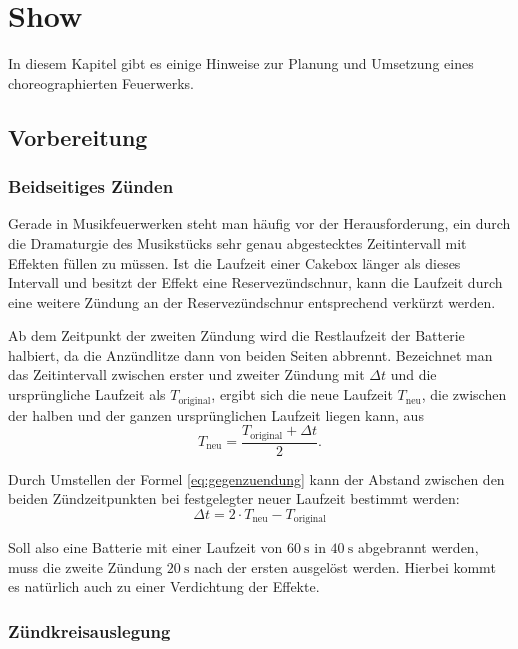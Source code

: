 \documentclass[paper=a4, parskip, numbers=noenddot, toc=listof, headsepline]{scrbook}
\begin{document}
	\chapter{Show}
		In diesem Kapitel gibt es einige Hinweise zur Planung und Umsetzung eines choreographierten Feuerwerks.
		\section{Vorbereitung}

			\subsection{Beidseitiges Zünden}
				Gerade in Musikfeuerwerken steht man häufig vor der Herausforderung, ein durch die Dramaturgie des Musikstücks sehr genau abgestecktes Zeitintervall mit Effekten füllen zu müssen. Ist die Laufzeit einer Cakebox länger als dieses Intervall und besitzt der Effekt eine Reservezündschnur, kann die Laufzeit durch eine weitere Zündung an der Reservezündschnur entsprechend verkürzt werden.

				Ab dem Zeitpunkt der zweiten Zündung wird die Restlaufzeit der Batterie halbiert, da die Anzündlitze dann von beiden Seiten abbrennt. Bezeichnet man das Zeitintervall zwischen erster und zweiter Zündung mit ${\Delta}t$ und die ursprüngliche Laufzeit als $T_\text{original}$, ergibt sich die neue Laufzeit $T_\text{neu}$, die zwischen der halben und der ganzen ursprünglichen Laufzeit liegen kann, aus
				\begin{equation}
					T_\text{neu} = \frac{T_\text{original} + {\Delta}t}{2}.
					\label{eq:gegenzuendung}
				\end{equation}

				Durch Umstellen der Formel \eqref{eq:gegenzuendung} kann der Abstand zwischen den beiden Zündzeitpunkten bei festgelegter neuer Laufzeit bestimmt werden:
				\begin{equation}
					{\Delta}t = 2 {\cdot} T_\text{neu} - T_\text{original}
				\end{equation}

				Soll also eine Batterie mit einer Laufzeit von $\SI{60}{\second}$ in $\SI{40}{\second}$ abgebrannt werden, muss die zweite Zündung $\SI{20}{\second}$ nach der ersten ausgelöst werden. Hierbei kommt es natürlich auch zu einer Verdichtung der Effekte.

			\subsection{Zündkreisauslegung}
\end{document}
